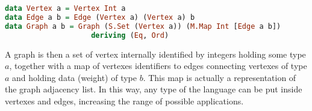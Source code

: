 \begin{lstlisting}[language=Haskell, basicstyle=\footnotesize]
data Vertex a = Vertex Int a
data Edge a b = Edge (Vertex a) (Vertex a) b
data Graph a b = Graph (S.Set (Vertex a)) (M.Map Int [Edge a b]) 
                    deriving (Eq, Ord)
\end{lstlisting}

A graph is then a set of vertex internally identified by integers holding some type $a$, together with
a map of vertexes identifiers to edges connecting vertexes of type $a$ and holding data (weight)
of type $b$. This map is actually a representation of the graph adjacency list. 
In this way, any type of the language can be put inside vertexes and
edges, increasing the range of possible applications.


